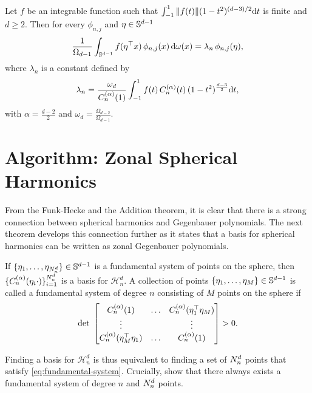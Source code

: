 \begin{theorem}
    Let $f$ be an integrable function such that $\int_{-1}^1 \| f(t)\| (1 - t^2)^{(d-3)/2} \mathrm{d}{t}$ is finite and $d \ge 2$. Then for every $\phi_{n,j}$  and $\eta \in \mathbb{S}^{d-1}$
    \begin{equation}
        \frac{1}{\Omega_{d-1}} \int_{\mathbb{S}^{d-1}} f(\eta^{\top} x)\,\phi_{n, j}(x)\, \mathrm{d}{\omega(x)} = {\lambda}_{n}\,\phi_{n,j}(\eta),
    \end{equation}
    where ${\lambda}_{n}$ is a constant defined by
    \begin{equation}
        \lambda_{n}  = 
        \frac{\omega_{d}}{C_n^{(\alpha)}(1)} \int_{-1}^1 f(t)\,C_n^{(\alpha)}(t)\,(1 - t^2)^{\frac{d-3}{2}} \mathrm{d}{t},
    \end{equation}
    with $\alpha = \frac{d-2}{2}$ and $\omega_d = \frac{\Omega_{d-2}}{\Omega_{d-1}}$.
\end{theorem}

\section{Algorithm: Zonal Spherical Harmonics}
\label{sec:zonal-spherical-harmonics}

From the Funk-Hecke and the Addition theorem, it is clear that there is a strong connection between spherical harmonics and Gegenbauer polynomials. The next theorem develops this connection further as it states that a basis for spherical harmonics can be written as zonal Gegenbauer polynomials. %

\begin{theorem}
    If $\{\eta_1, \ldots, \eta_{N^d_n} \} \in \mathbb{S}^{d-1}$ is a fundamental system of points on the sphere, then $\{C_n^{(\alpha)}(\eta_i \cdot)\}_{i=1}^{N^d_n}$ is a basis for $\mathcal{H}_n^d$. A collection of points $\{\eta_1, \ldots, \eta_M \} \in \mathbb{S}^{d-1}$ is called a fundamental system of degree $n$ consisting of $M$ points on the sphere if
    \begin{equation}
        \label{eq:fundamental-system}
        \textrm{det}\ 
        \begin{bmatrix}
            C_n^{(\alpha)}(1) & \ldots & C_n^{(\alpha)}(\eta_1\transpose\eta_M) \\
            \vdots & & \vdots \\
            C_n^{(\alpha)}(\eta_M\transpose\eta_1) & \ldots & C_n^{(\alpha)}(1)
        \end{bmatrix} > 0.
    \end{equation}
\end{theorem}
Finding a basis for $\mathcal{H}_n^d$ is thus equivalent to finding a set of $N^d_n$ points that satisfy \cref{eq:fundamental-system}. Crucially, \citet[Lemma~3]{dai2013} show that there always exists a fundamental system of degree $n$ and $N^d_n$ points.

